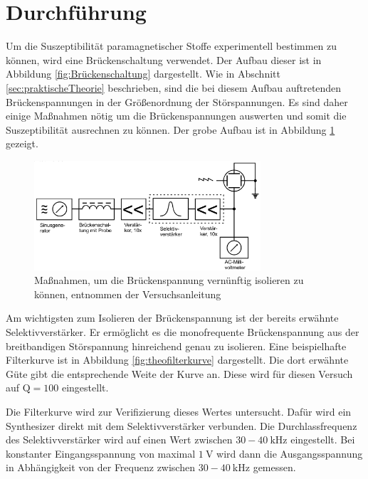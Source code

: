 \FloatBarrier
\section{Durchführung}
\label{sec:Durchführung}

Um die Suszeptibilität paramagnetischer Stoffe experimentell bestimmen zu können, wird eine Brückenschaltung verwendet.
Der Aufbau dieser ist in Abbildung \ref{fig:Brückenschaltung} dargestellt.
Wie in Abschnitt \ref{sec:praktischeTheorie} beschrieben, sind die bei diesem Aufbau auftretenden Brückenspannungen in der Größenordnung der Störspannungen.
Es sind daher einige Maßnahmen nötig um die Brückenspannungen auswerten und somit die Suszeptibilität ausrechnen zu können.
Der grobe Aufbau ist in Abbildung \ref{fig:Aufbau} gezeigt.

\begin{figure}
  \centering
  \includegraphics[width=0.75\textwidth]{images/Aufbau.png}
  \caption{Maßnahmen, um die Brückenspannung vernünftig isolieren zu können, entnommen der Versuchsanleitung\cite[183]{sample}}
  \label{fig:Aufbau}
\end{figure}

 Am wichtigsten zum Isolieren der Brückenspannung ist der bereits erwähnte Selektivverstärker.
 Er ermöglicht es die monofrequente Brückenspannung aus der breitbandigen Störspannung hinreichend genau zu isolieren.
 Eine beispielhafte Filterkurve ist in Abbildung \ref{fig:theofilterkurve} dargestellt.
 Die dort erwähnte Güte gibt die entsprechende Weite der Kurve an.
 Diese wird für diesen Versuch auf $\text{Q} = 100$ eingestellt.

 Die Filterkurve wird zur Verifizierung dieses Wertes untersucht.
 Dafür wird ein Synthesizer direkt mit dem Selektivverstärker verbunden.
 Die Durchlassfrequenz des Selektivverstärker wird auf einen Wert zwischen $30 - \SI{40}{\kilo\hertz}$ eingestellt.
 Bei konstanter Eingangsspannung von maximal $\SI{1}{\volt}$ wird dann die Ausgangsspannung in Abhängigkeit von der Frequenz zwischen $30 - \SI{40}{\kilo\hertz}$ gemessen.

